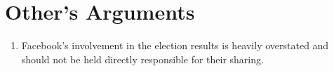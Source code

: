 
\section{Other's Arguments}

\begin{enumerate}

\item{Facebook's involvement in the election results is heavily overstated and should not be held directly responsible for their sharing. \cite{stanford_fake_news_study}}

\end{enumerate}
